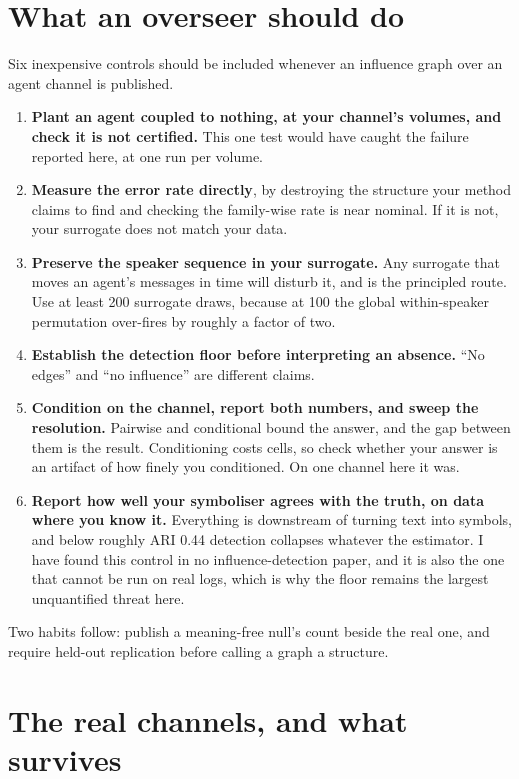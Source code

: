 \documentclass[10pt]{article}
\begin{document}
\section{What an overseer should do}

Six inexpensive controls should be included whenever an influence graph over an agent channel is
published.

\begin{enumerate}
\item \textbf{Plant an agent coupled to nothing, at your channel's volumes, and check it is not
certified.} This one test would have caught the failure reported here, at one run per volume.
\item \textbf{Measure the error rate directly}, by destroying the structure your method claims to
find and checking the family-wise rate is near nominal. If it is not, your surrogate does not match
your data.
\item \textbf{Preserve the speaker sequence in your surrogate.} Any surrogate that moves an agent's
messages in time will disturb it, and \citet{shorten2021} is the principled route. Use at least 200
surrogate draws, because at 100 the global within-speaker permutation over-fires by roughly a factor
of two.
\item \textbf{Establish the detection floor before interpreting an absence.} ``No edges'' and ``no
influence'' are different claims.
\item \textbf{Condition on the channel, report both numbers, and sweep the resolution.} Pairwise and
conditional bound the answer, and the gap between them is the result. Conditioning costs cells, so
check whether your answer is an artifact of how finely you conditioned. On one channel here it was.
\item \textbf{Report how well your symboliser agrees with the truth, on data where you know it.}
Everything is downstream of turning text into symbols, and below roughly ARI 0.44 detection
collapses whatever the estimator. I have found this control in no influence-detection paper, and it
is also the one that cannot be run on real logs, which is why the floor remains the largest
unquantified threat here.
\end{enumerate}

Two habits follow: publish a meaning-free null's count beside the real one, and require held-out
replication before calling a graph a structure.

\section{The real channels, and what survives}
\end{document}
